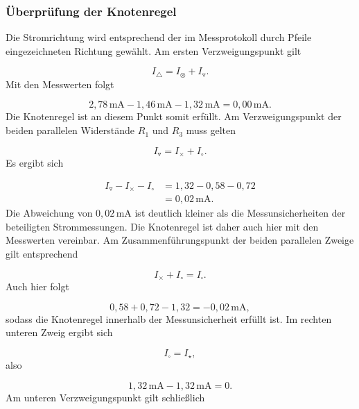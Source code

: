 \documentclass{report}
\begin{document}
\subsubsection{Überprüfung der Knotenregel}
\noindent
Die Stromrichtung wird entsprechend der im Messprotokoll durch Pfeile eingezeichneten
Richtung gewählt.
\noindent
Am ersten Verzweigungspunkt gilt

\begin{equation}
I_{\triangle}
=
I_{\otimes}
+
I_{\triangledown}.
\end{equation}
\noindent
Mit den Messwerten folgt

\begin{equation}
2{,}78\,\mathrm{mA}
-
1{,}46\,\mathrm{mA}
-
1{,}32\,\mathrm{mA}
=
0{,}00\,\mathrm{mA}.
\end{equation}
\noindent
Die Knotenregel ist an diesem Punkt somit erfüllt.
\noindent
Am Verzweigungspunkt der beiden parallelen Widerstände $R_1$ und $R_3$
muss gelten

\begin{equation}
I_{\triangledown}
=
I_{\times}
+
I_{\circ}.
\end{equation}
\noindent
Es ergibt sich

\begin{align}
I_{\triangledown}
-
I_{\times}
-
I_{\circ}
&=
1{,}32-0{,}58-0{,}72\\
&=
0{,}02\,\mathrm{mA}.
\end{align}
\noindent
Die Abweichung von $0{,}02\,\mathrm{mA}$ ist deutlich kleiner als die
Messunsicherheiten der beteiligten Strommessungen. Die Knotenregel ist daher
auch hier mit den Messwerten vereinbar.
\noindent
Am Zusammenführungspunkt der beiden parallelen Zweige gilt entsprechend

\begin{equation}
I_{\times}+I_{\circ}=I_{\square}.
\end{equation}
\nonumber
Auch hier folgt

\begin{equation}
0{,}58+0{,}72-1{,}32
=
-0{,}02\,\mathrm{mA},
\end{equation}
\noindent
sodass die Knotenregel innerhalb der Messunsicherheit erfüllt ist.
\noindent
Im rechten unteren Zweig ergibt sich

\begin{equation}
I_{\square}=I_{\star},
\end{equation}
\noindent
also

\begin{equation}
1{,}32\,\mathrm{mA}
-
1{,}32\,\mathrm{mA}
=
0.
\end{equation}
\noindent
Am unteren Verzweigungspunkt gilt schließlich
\end{document}
